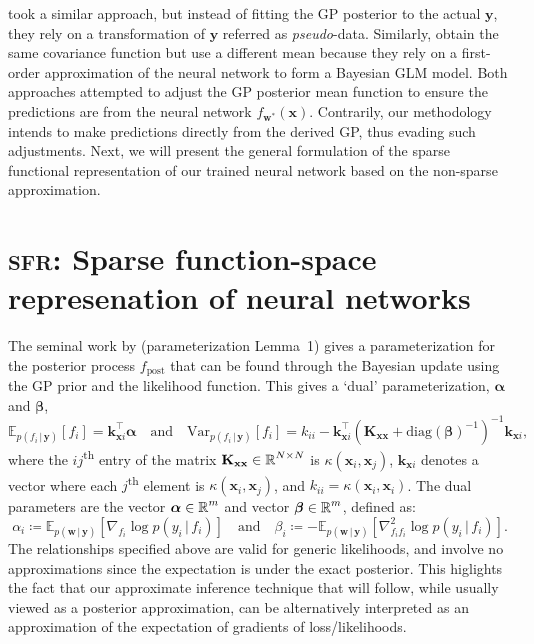 \documentclass{article}
\renewcommand{\paragraph}[1]{{\bf #1}~~}
\newcommand{\our}{\textsc{sfr}\xspace}
\newcommand{\mathbold}[1]{\bm{#1}}
\newcommand{\mbf}[1]{\mathbf{#1}}
\renewcommand{\mid}{\,|\,}
\newcommand{\valpha}[0]{\mathbold{\alpha}}
\newcommand{\vbeta}[0]{\mathbold{\beta}}
\newcommand{\diag}{\text{{diag}}}
\newcommand{\vx}{\mbf{x}}
\newcommand{\vy}{\mbf{y}}
\newcommand{\vw}{\mbf{w}}
\newcommand{\MKxx}{\mbf{K}_{\mbf{x}\mbf{x}}}
\newcommand{\vk}{\mbf{k}}
\newcommand{\myexpect}{\mathbb{E}}
\begin{document}
%
\citet{khan2019approximate} took a similar approach, but instead of fitting the GP posterior to the actual $\vy$, they rely on a transformation of $\vy$ referred as {\em pseudo}-data. Similarly, \citet{immer2021improving} obtain the same covariance function but use a different mean because they rely on a first-order approximation of the neural network to form a Bayesian GLM model. Both approaches attempted to adjust the GP posterior mean function to ensure the predictions are from the neural network $f_{\vw^*}(\vx)$. 
Contrarily, our methodology intends to make predictions directly from the derived GP, thus evading such adjustments. Next, we will present the general formulation of the sparse functional representation of our trained neural network based on the non-sparse approximation. 



\section{\our: Sparse function-space represenation of neural networks}
The seminal work by \citet{csato2002sparse} (parameterization Lemma~1) gives a parameterization for the posterior process $f_{\textrm{post}}$ that can be found through the Bayesian update using the GP prior and the likelihood function. This gives a `dual' parameterization, $\valpha$ and $\vbeta$,
%
\begin{equation}  \label{eq:gp_pred}
  \myexpect_{p(f_i \mid\vy)}[f_i]= \vk_{\vx i}^\top \valpha \quad \text{and} \quad
  \mathrm{Var}_{p(f_i \mid \vy)}[f_i] = k_{ii} - \vk_{\vx i}^\top ( \MKxx + \diag(\vbeta)^{-1})^{-1} \vk_{\vx i},
\end{equation}
%
where the $ij$\textsuperscript{th} entry of the matrix $\MKxx \in \R^{N \times N}$ is $\kappa(\vx_i,\vx_j)$, $\vk_{\vx i}$ denotes a vector where each $j$\textsuperscript{th} element is $\kappa(\vx_i, \vx_j)$, and $k_{ii} = \kappa(\vx_i, \vx_i)$.  The dual parameters are the vector $\valpha \in \R^{m}$ and vector $\vbeta \in \R^{m}$, defined as:
%
\begin{equation}
  \label{eq:dual_param}
  \alpha_i \coloneqq \myexpect_{p(\vw \mid \vy)}[\nabla_{f_i}\log p(y_i \mid f_i)]
  \quad \text{and} \quad
  \beta_i \coloneqq - \myexpect_{p(\vw \mid \vy)}[\nabla^2_{f_i f_i}\log p(y_i \mid f_i)] .
\end{equation}
%
The relationships specified above are valid for generic likelihoods, and involve no approximations since the expectation is under the exact posterior. This higlights the fact that our approximate inference technique that will follow, while usually viewed as a posterior approximation, can be alternatively interpreted as an approximation of the expectation of gradients of loss/likelihoods.
\end{document}
